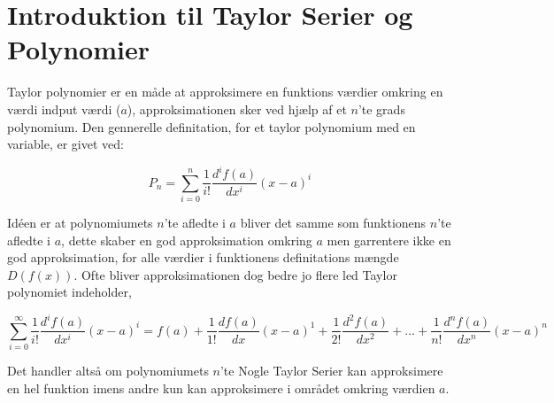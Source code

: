 \chapter{Introduktion til Taylor Serier og Polynomier}
\label{ch:ItTP}
Taylor polynomier er en måde at approksimere en funktions værdier omkring en værdi indput værdi ($a$), 
approksimationen sker ved hjælp af et $n$'te grads polynomium. Den gennerelle definitation, for et taylor polynomium med en variable, er givet ved:

\[
P_n = \sum^{n}_{i=0} \frac{1}{i!} \frac{d^i f(a)}{dx^i} (x-a)^{i}
\]
\label{def:taylorPolynomium}

Idéen er at polynomiumets $n$'te afledte i $a$ bliver det samme som funktionens $n$'te afledte i $a$, 
dette skaber en god approksimation omkring $a$ men garrentere ikke en god approksimation, 
for alle værdier i funktionens definitations mængde $D(f(x))$. Ofte bliver approksimationen dog bedre jo flere led
Taylor polynomiet indeholder, 


\[
\sum^{\infty}_{i=0} \frac{1}{i!} \frac{d^i f(a)}{dx^i} (x-a)^{i} = f(a) + \frac{1}{1!} \frac{df(a)}{dx} (x-a)^{1} + \frac{1}{2!} \frac{d^{2}f(a)}{dx^{2}} + \ldots + \frac{1}{n!} \frac{d^{n} f(a)}{dx^{n}} (x-a)^{n}
\]
\label{def:taylorSerie}



Det handler altså om polynomiumets $n$'te 
Nogle Taylor Serier kan approksimere en hel funktion imens andre kun kan approksimere i området omkring værdien $a$.